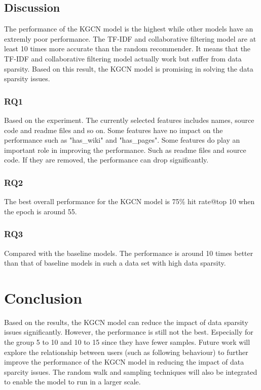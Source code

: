\documentclass[11pt,twoside]{report}
\begin{document}
\section{Discussion}
The performance of the KGCN model is the highest while other models have an extremly poor performance. The TF-IDF and collaborative filtering model are at least 10 times more accurate than the random recommender. It means that the TF-IDF and collaborative filtering model actually work but suffer from data sparsity. Based on this result, the KGCN model is promising in solving the data sparsity issues.

\subsection{RQ1}
Based on the experiment. The currently selected features includes names, source code and readme files and so on. Some features have no impact on the performance such as "has\_wiki" and "has\_pages". Some features do play an important role in improving the performance. Such as readme files and source code. If they are removed, the performance can drop significantly.

\subsection{RQ2}
The best overall performance for the KGCN model is 75\% hit rate@top 10 when the epoch is around 55.

\subsection{RQ3}
Compared with the baseline models. The performance is around 10 times better than that of baseline models in such a data set with high data sparsity.

\chapter{Conclusion}
Based on the results, the KGCN model can reduce the impact of data sparsity issues significantly. However, the performance is still not the best. Especially for the group 5 to 10 and 10 to 15 since they have fewer samples. Future work will explore the relationship between users (such as following behaviour) to further improve the performance of the KGCN model in reducing the impact of data sparcity issues. The random walk and sampling techniques will also be integrated to enable the model to run in a larger scale.




\end{document}
